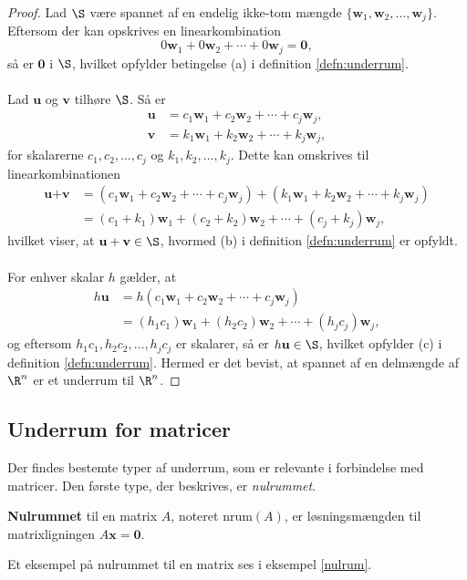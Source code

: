 \begin{proof}
Lad $\S$ være spannet af en endelig ikke-tom mængde 
$\{\textbf{w}_1 , \textbf{w}_2 , \ldots , \textbf{w}_j\}$.
Eftersom der kan opskrives en linearkombination 
$$0\textbf{w}_1 + 0\textbf{w}_2 + \cdots + 0\textbf{w}_j=\textbf{0},$$ 
så er $\textbf{0}$ i  $\S$, hvilket opfylder betingelse (a) i definition \ref{defn:underrum}.
\\\\
%
Lad $\textbf{u}$ og $\textbf{v}$ tilhøre $\S$. Så er
%
\begin{align*}
\textbf{u}&=c_1\textbf{w}_1+c_2\textbf{w}_2+\cdots+c_j\textbf{w}_j, \\ 
\textbf{v}&=k_1\textbf{w}_1+k_2\textbf{w}_2+\cdots+k_j\textbf{w}_j,
\end{align*}
%
for skalarerne $c_1,c_2,\ldots,c_j$ og $k_1,k_2,\ldots,k_j$. 
Dette kan omskrives til linearkombinationen
%
\begin{align*}
\textbf{u}+\textbf{v}&=(c_1\textbf{w}_1+c_2\textbf{w}_2+\cdots+c_j\textbf{w}_j)+(k_1\textbf{w}_1+k_2\textbf{w}_2+\cdots+k_j\textbf{w}_j)\\
&=(c_1+k_1)\textbf{w}_1+(c_2+k_2)\textbf{w}_2+\cdots+(c_j+k_j)\textbf{w}_j,
\end{align*}
hvilket viser, at $\textbf{u}+\textbf{v}\in \S$, hvormed (b) i definition \ref{defn:underrum} er opfyldt.
\\\\
For enhver skalar $h$ gælder, at
\begin{align*}
h\textbf{u}&=h(c_1\textbf{w}_1+c_2\textbf{w}_2+\cdots+c_j\textbf{w}_j)\\
&=(h_1c_1)\textbf{w}_1+(h_2c_2)\textbf{w}_2+\cdots+(h_jc_j)\textbf{w}_j,
\end{align*}
og eftersom $h_1c_1,h_2c_2,\ldots,h_jc_j$ er skalarer, så er $h\textbf{u}\in \S$, hvilket opfylder (c) i definition \ref{defn:underrum}.
Hermed er det bevist, at spannet af en delmængde af $\R^n$ er et underrum til $\R^n$.
\end{proof}

\subsection{Underrum for matricer}
Der findes bestemte typer af underrum, som er relevante i forbindelse med matricer. Den første type, der beskrives, er \textit{nulrummet}.
%
\begin{defn}{}{}
\textbf{Nulrummet} til en matrix $A$, noteret $\text{nrum}(A)$, er løsningsmængden til matrixligningen $A\textbf{x}=\textbf{0}$. 
\end{defn}
%
\noindent
Et eksempel på nulrummet til en matrix ses i eksempel \ref{nulrum}.

